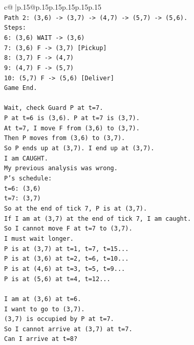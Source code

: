 \documentclass{article}
\begin{document}
{\begin{supertabular}{c@{$\;$}|p{.15\linewidth}@{}p{.15\linewidth}p{.15\linewidth}p{.15\linewidth}p{.15\linewidth}p{.15\linewidth}}
{{{\\ 
\texttt{Path 2: (3,6) {-}> (3,7) {-}> (4,7) {-}> (5,7) {-}> (5,6).} \\
\texttt{Steps:} \\
\texttt{6: (3,6) WAIT {-}> (3,6)} \\
\texttt{7: (3,6) F {-}> (3,7) {[}Pickup{]}} \\
\texttt{8: (3,7) F {-}> (4,7)} \\
\texttt{9: (4,7) F {-}> (5,7)} \\
\texttt{10: (5,7) F {-}> (5,6) {[}Deliver{]}} \\
\texttt{Game End.} \\
\\ 
\texttt{Wait, check Guard P at t=7.} \\
\texttt{P at t=6 is (3,6). P at t=7 is (3,7).} \\
\texttt{At t=7, I move F from (3,6) to (3,7).} \\
\texttt{Then P moves from (3,6) to (3,7).} \\
\texttt{So P ends up at (3,7). I end up at (3,7).} \\
\texttt{I am CAUGHT.} \\
\texttt{My previous analysis was wrong.} \\
\texttt{P's schedule:} \\
\texttt{t=6: (3,6)} \\
\texttt{t=7: (3,7)} \\
\texttt{So at the end of tick 7, P is at (3,7).} \\
\texttt{If I am at (3,7) at the end of tick 7, I am caught.} \\
\texttt{So I cannot move F at t=7 to (3,7).} \\
\texttt{I must wait longer.} \\
\texttt{P is at (3,7) at t=1, t=7, t=15...} \\
\texttt{P is at (3,6) at t=2, t=6, t=10...} \\
\texttt{P is at (4,6) at t=3, t=5, t=9...} \\
\texttt{P is at (5,6) at t=4, t=12...} \\
\\ 
\texttt{I am at (3,6) at t=6.} \\
\texttt{I want to go to (3,7).} \\
\texttt{(3,7) is occupied by P at t=7.} \\
\texttt{So I cannot arrive at (3,7) at t=7.} \\
\texttt{Can I arrive at t=8?} \\
}}}
\end{supertabular}}
\end{document}
